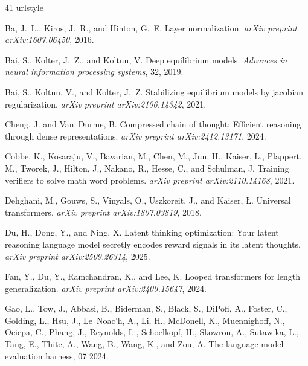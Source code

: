 \begin{thebibliography}{41}
\providecommand{\natexlab}[1]{#1}
\providecommand{\url}[1]{\texttt{#1}}
\expandafter\ifx\csname urlstyle\endcsname\relax
  \providecommand{\doi}[1]{doi: #1}\else
  \providecommand{\doi}{doi: \begingroup \urlstyle{rm}\Url}\fi

Ba, J.~L., Kiros, J.~R., and Hinton, G.~E.
\newblock Layer normalization.
\newblock \textit{arXiv preprint arXiv:1607.06450}, 2016.

Bai, S., Kolter, J.~Z., and Koltun, V.
\newblock Deep equilibrium models.
\newblock \textit{Advances in neural information processing systems}, 32, 2019.

Bai, S., Koltun, V., and Kolter, J.~Z.
\newblock Stabilizing equilibrium models by jacobian regularization.
\newblock \textit{arXiv preprint arXiv:2106.14342}, 2021.

Cheng, J. and Van~Durme, B.
\newblock Compressed chain of thought: Efficient reasoning through dense
  representations.
\newblock \textit{arXiv preprint arXiv:2412.13171}, 2024.

Cobbe, K., Kosaraju, V., Bavarian, M., Chen, M., Jun, H., Kaiser, L., Plappert,
  M., Tworek, J., Hilton, J., Nakano, R., Hesse, C., and Schulman, J.
\newblock Training verifiers to solve math word problems.
\newblock \textit{arXiv preprint arXiv:2110.14168}, 2021.

Dehghani, M., Gouws, S., Vinyals, O., Uszkoreit, J., and Kaiser, {\L}.
\newblock Universal transformers.
\newblock \textit{arXiv preprint arXiv:1807.03819}, 2018.

Du, H., Dong, Y., and Ning, X.
\newblock Latent thinking optimization: Your latent reasoning language model
  secretly encodes reward signals in its latent thoughts.
\newblock \textit{arXiv preprint arXiv:2509.26314}, 2025.

Fan, Y., Du, Y., Ramchandran, K., and Lee, K.
\newblock Looped transformers for length generalization.
\newblock \textit{arXiv preprint arXiv:2409.15647}, 2024.

Gao, L., Tow, J., Abbasi, B., Biderman, S., Black, S., DiPofi, A., Foster, C.,
  Golding, L., Hsu, J., Le~Noac'h, A., Li, H., McDonell, K., Muennighoff, N.,
  Ociepa, C., Phang, J., Reynolds, L., Schoelkopf, H., Skowron, A., Sutawika,
  L., Tang, E., Thite, A., Wang, B., Wang, K., and Zou, A.
\newblock The language model evaluation harness, 07 2024.


\end{thebibliography}
